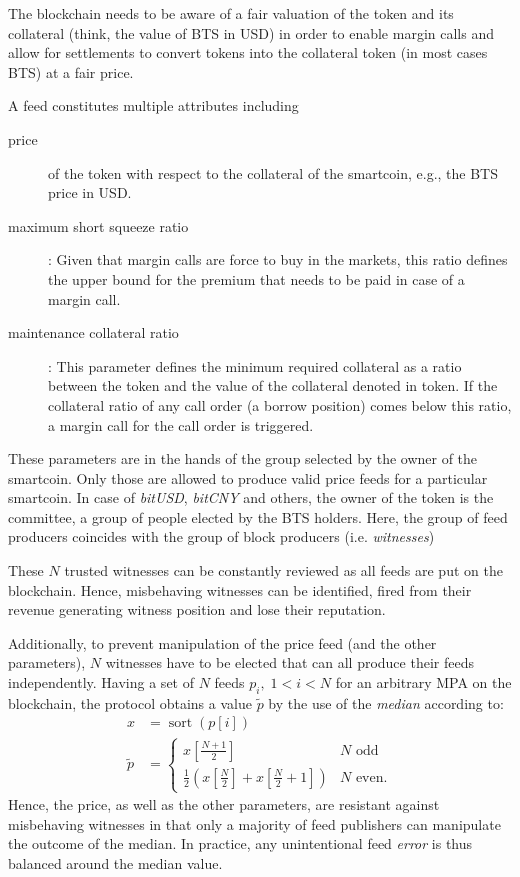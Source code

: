 \label{sec:feeds}

The blockchain needs to be aware of a fair valuation of the token and
its collateral (think, the value of BTS in USD) in order to enable
margin calls and allow for settlements to convert tokens into the
collateral token (in most cases BTS) at a fair price.

A feed constitutes multiple attributes including
\begin{description}
 \item[price] of the token with respect to the collateral of the smartcoin,
  e.g., the BTS price in USD.
 \item[maximum short squeeze ratio]: Given that margin calls are force to buy
  in the markets, this ratio defines the upper bound for the premium that needs
  to be paid in case of a margin call.
 \item[maintenance collateral ratio]: This parameter defines the minimum
  required collateral as a ratio between the token and the value of the
  collateral denoted in token. If the collateral ratio of any call order (a
  borrow position) comes below this ratio, a margin call for the call order is
  triggered.
\end{description}

These parameters are in the hands of the group selected by the owner of the
smartcoin. Only those are allowed to produce valid price feeds for a particular
smartcoin. In case of \emph{bitUSD}, \emph{bitCNY} and others, the owner of the
token is the committee, a group of people elected by the BTS holders. Here, the
group of feed producers coincides with the group of block producers (i.e.
\emph{witnesses})

These $N$ trusted witnesses can be constantly reviewed as all feeds are put on
the blockchain. Hence, misbehaving witnesses can be identified, fired from
their revenue generating witness position and lose their reputation.

Additionally, to prevent manipulation of the price feed (and the other
parameters), $N$ witnesses have to be elected that can all produce their feeds
independently. Having a set of $N$ feeds $p_i,\;1<i<N$ for an arbitrary MPA on
the blockchain, the protocol obtains a value $\tilde{p}$ by the use of the
\emph{median} according to:
\begin{align}
 x &= \operatorname{sort}(p[i])\\
 \tilde p &=\begin{cases}
   x[\frac{N+1}{2}]                                               & N \text{ odd}\\
   \frac {1}{2}\left(x[{\frac{N}{2}}] + x[\frac{N}{2} + 1]\right) & N \text{ even.}
 \end{cases}
\end{align}
Hence, the price, as well as the other parameters, are resistant against
misbehaving witnesses in that only a majority of feed publishers can manipulate
the outcome of the median. In practice, any unintentional feed \emph{error} is
thus balanced around the median value.




